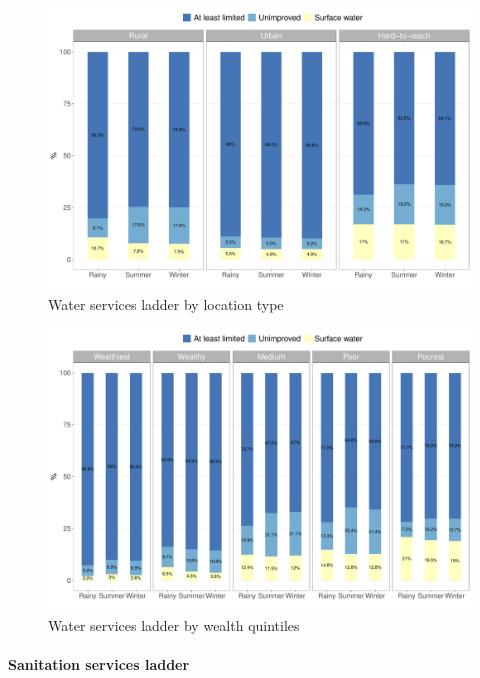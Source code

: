 \documentclass[12pt,a4paper]{article}
\let\oldparagraph\paragraph
\renewcommand{\paragraph}[1]{\oldparagraph{#1}\mbox{}}
\begin{document}
\begin{figure}[H]

{\centering \includegraphics{kayahReport_files/figure-latex/wash1plot-1} 

}

\caption{Water services ladder by location type}\label{fig:wash1plot}
\end{figure}

\begin{figure}[H]

{\centering \includegraphics{kayahReport_files/figure-latex/wash2plot-1} 

}

\caption{Water services ladder by wealth quintiles}\label{fig:wash2plot}
\end{figure}

\hypertarget{sanitation-services-ladder}{%
\paragraph{Sanitation services ladder}\label{sanitation-services-ladder}}
\end{document}
